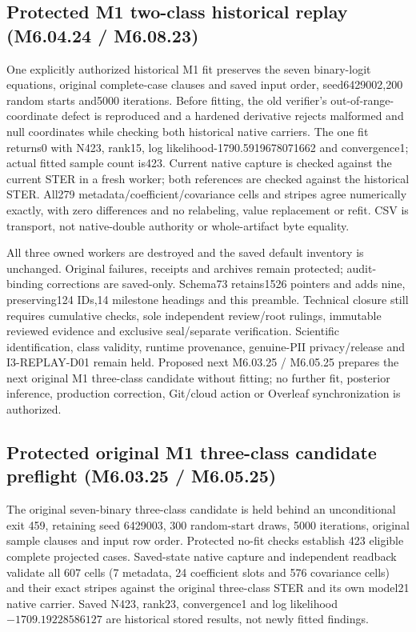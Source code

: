 \documentclass[11pt,a4paper]{article}
\begin{document}
\subsection*{Protected M1 two-class historical replay (M6.04.24 / M6.08.23)}
One explicitly authorized historical M1 fit preserves the seven binary-logit equations, original complete-case clauses and saved input order, seed6429002,200 random starts and5000 iterations. Before fitting, the old verifier's out-of-range-coordinate defect is reproduced and a hardened derivative rejects malformed and null coordinates while checking both historical native carriers. The one fit returns0 with N423, rank15, log likelihood-1790.5919678071662 and convergence1; actual fitted sample count is423. Current native capture is checked against the current STER in a fresh worker; both references are checked against the historical STER. All279 metadata/coefficient/covariance cells and stripes agree numerically exactly, with zero differences and no relabeling, value replacement or refit. CSV is transport, not native-double authority or whole-artifact byte equality.

All three owned workers are destroyed and the saved default inventory is unchanged. Original failures, receipts and archives remain protected; audit-binding corrections are saved-only. Schema73 retains1526 pointers and adds nine, preserving124 IDs,14 milestone headings and this preamble. Technical closure still requires cumulative checks, sole independent review/root rulings, immutable reviewed evidence and exclusive seal/separate verification. Scientific identification, class validity, runtime provenance, genuine-PII privacy/release and I3-REPLAY-D01 remain held. Proposed next M6.03.25 / M6.05.25 prepares the next original M1 three-class candidate without fitting; no further fit, posterior inference, production correction, Git/cloud action or Overleaf synchronization is authorized.
\subsection*{Protected original M1 three-class candidate preflight (M6.03.25 / M6.05.25)}
The original seven-binary three-class candidate is held behind an unconditional exit 459, retaining seed 6429003, 300 random-start draws, 5000 iterations, original sample clauses and input row order. Protected no-fit checks establish 423 eligible complete projected cases. Saved-state native capture and independent readback validate all 607 cells (7 metadata, 24 coefficient slots and 576 covariance cells) and their exact stripes against the original three-class STER and its own model21 native carrier. Saved N423, rank23, convergence1 and log likelihood $-1709.19228586127$ are historical stored results, not newly fitted findings.
\end{document}
